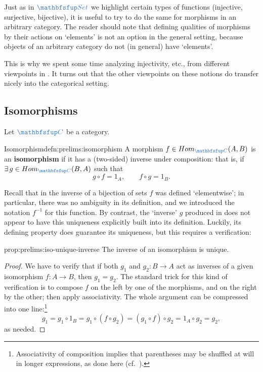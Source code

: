 Just as in $\categ{Set}$ we highlight certain types of functions
(injective, surjective, bijective), it is useful to try to do the same
for morphisms in an arbitrary category. The reader should note that
defining qualities of morphisms by their actions on `elements' is not
an option in the general setting, because objects of an arbitrary
category do not (in general) have `elements'.

This is why we spent some time analyzing injectivity, etc., from
different viewpoints in
. It
turns out that the other viewpoints on these notions do transfer
nicely into the categorical setting.

\subsection{Isomorphisms}%
\label{subsec:prelims:isomorphisms}
Let $\categ{C}$ be a category.

\begin{defn}{Isomorphism}{defn:prelims:isomorphism}
  A morphism $f \in \Hom_{\categ{C}}(A,B)$ is an \textbf{isomorphism}
  if it has a (two-sided) inverse under composition: that is, if
  $\exists\, g \in \Hom_{\categ{C}}(B,A)$ such that
  \[
    g \circ f = 1_A, \qquad f \circ g = 1_B.
  \]
\end{defn}

Recall that in
the inverse of a bijection of sets $f$ was defined `elementwise'; in
particular, there was no ambiguity in its definition, and we
introduced the notation $f^{-1}$ for this function. By contrast, the
`inverse' $g$ produced in  does not
appear to have this uniqueness explicitly built into its
definition. Luckily, its defining property does guarantee its
uniqueness, but this requires a verification:

\begin{prop}{}{prop:prelims:iso-unique-inverse}
  The inverse of an isomorphism is unique.
\end{prop}
\begin{proof}
  We have to verify that if both $g_1$ and $g_2 \colon B \to A$ act as
  inverses of a given isomorphism $f \colon A \to B$, then
  $g_1 = g_2$. The standard trick for this kind of verification is to
  compose $f$ on the left by one of the morphisms, and on the right by
  the other; then apply associativity. The whole argument can be
  compressed into one line:\footnote{Associativity of composition
    implies that parentheses may be shuffled at will in longer
    expressions, as done here (cf.\
    ).}
  \[
    g_1 = g_1 \circ 1_B = g_1 \circ (f \circ g_2) = (g_1 \circ f)
    \circ g_2 = 1_A \circ g_2 = g_2,
  \]
  as needed.
\end{proof}

